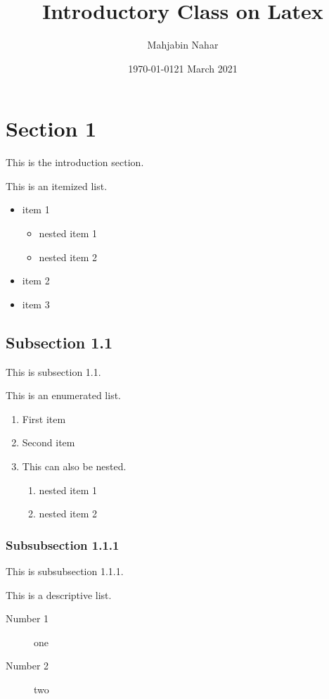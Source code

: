 \documentclass[14pt, a4paper]{article} %
\title{Introductory Class on Latex}
\author{Mahjabin Nahar}
\date{\today}
\date{21 March 2021}
\begin{document}
\maketitle
\tableofcontents %
\pagebreak %

\section{Section 1}
\label{sec:intro} %
This is the introduction section.

This is an itemized list.
\begin{itemize}
 \item item 1
 \begin{itemize}
     \item nested item 1
     \item nested item 2
 \end{itemize}
 \item item 2
 \item item 3
\end{itemize}

\subsection{Subsection 1.1}
\label{subsec:1.1} %
This is subsection 1.1.

This is an enumerated list.
\begin{enumerate}
 \item First item
 \item Second item
 \item This can also be nested.
 \begin{enumerate}
     \item nested item 1
     \item nested item 2
 \end{enumerate}
\end{enumerate}

\subsubsection{Subsubsection 1.1.1}
This is subsubsection 1.1.1.

This is a descriptive list.
\begin{description}
\item[Number 1] one
\item[Number 2] two
\end{description}
\end{document}
